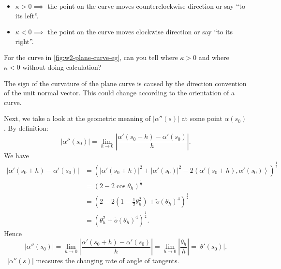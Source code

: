 \begin{itemize}
    \item \(\kappa>0\implies \) the point on the curve moves counterclockwise
        direction or say ``to its left''.
    \item \(\kappa<0\implies \) the point on the curve moves clockwise direction
        or say ``to its right''.
\end{itemize}

\begin{ques}
    For the curve in \cref{fig:w2-plane-curve-eg}, can you tell where \(\kappa>0\)
    and where \(\kappa<0\) without doing calculation?
\end{ques}

\begin{remark}
    The sign of the curvature of the plane curve is caused by the direction
    convention of the unit normal vector. This could change according to the
    orientation of a curve.
\end{remark}

Next, we take a look at the geometric meaning of \(|\alpha''(s)|\) at some point
\(\alpha(s_0)\). By definition: \[
    |\alpha''(s_0)|=\lim_{h \to 0} \left|\frac{\alpha'(s_0+h)-\alpha'(s_0)}{h}\right|
.\] 
We have
\begin{align*}
    |\alpha'(s_0+h)-\alpha'(s_0)|
    &= \left(|\alpha'(s_0+h)|^2+|\alpha'(s_0)|^2-2\left<\alpha'(s_0+h),
    \alpha'(s_0)\right> \right)^{\frac{1}{2}} \\
    &= (2-2\cos\theta_h)^{\frac{1}{2}} \\
    &= (2-2(1-\frac{1}{2}\theta_h^2)+\tilde{o}(\theta_h)^4)^{\frac{1}{2}} \\
    &= (\theta_h^2+\tilde{o}(\theta_h)^4)^{\frac{1}{2}}
.\end{align*}
Hence \[
    |\alpha''(s_0)|=\lim_{h \to 0} \left|\frac{\alpha'(s_0+h)-\alpha'(s_0)}{h}\right|
    =\lim_{h \to 0} \left|\frac{\theta_h}{h}\right|=|\theta'(s_0)|
.\] \ie\ \(|\alpha''(s)|\) measures the changing rate of angle of tangents.
